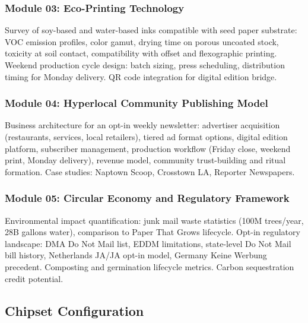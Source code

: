 \documentclass[11pt,letterpaper]{article}
\begin{document}
\subsubsection{Module 03: Eco-Printing Technology}
Survey of soy-based and water-based inks compatible with seed paper substrate: VOC emission profiles, color gamut, drying time on porous uncoated stock, toxicity at soil contact, compatibility with offset and flexographic printing. Weekend production cycle design: batch sizing, press scheduling, distribution timing for Monday delivery. QR code integration for digital edition bridge.

\subsubsection{Module 04: Hyperlocal Community Publishing Model}
Business architecture for an opt-in weekly newsletter: advertiser acquisition (restaurants, services, local retailers), tiered ad format options, digital edition platform, subscriber management, production workflow (Friday close, weekend print, Monday delivery), revenue model, community trust-building and ritual formation. Case studies: Naptown Scoop, Crosstown LA, Reporter Newspapers.

\subsubsection{Module 05: Circular Economy and Regulatory Framework}
Environmental impact quantification: junk mail waste statistics (100M trees/year, 28B gallons water), comparison to Paper That Grows lifecycle. Opt-in regulatory landscape: DMA Do Not Mail list, EDDM limitations, state-level Do Not Mail bill history, Netherlands JA/JA opt-in model, Germany Keine Werbung precedent. Composting and germination lifecycle metrics. Carbon sequestration credit potential.

\subsection{Chipset Configuration}
\end{document}
